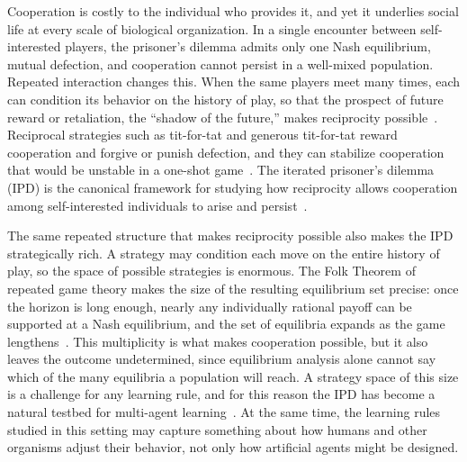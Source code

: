 \documentclass[10pt]{article}
\makeatletter
\renewcommand\section{\@startsection{section}{1}{\z@}{-3ex \@plus -1ex \@minus -.2ex}{1.2ex \@plus .2ex}{\sffamily\bfseries\Large}}
\makeatother
\begin{document}
\section{Introduction}

Cooperation is costly to the individual who provides it, and yet it underlies social life at every scale of biological organization. In a single encounter between self-interested players, the prisoner's dilemma admits only one Nash equilibrium, mutual defection, and cooperation cannot persist in a well-mixed population. Repeated interaction changes this. When the same players meet many times, each can condition its behavior on the history of play, so that the prospect of future reward or retaliation, the ``shadow of the future,'' makes reciprocity possible~\cite{trivers1971-EvolutionReciprocalAltruisma,axelrod1981-EvolutionCooperation}. Reciprocal strategies such as tit-for-tat and generous tit-for-tat reward cooperation and forgive or punish defection, and they can stabilize cooperation that would be unstable in a one-shot game~\cite{nowak1990-EvolutionStochasticStrategies,nowak1992-TitTatHeterogeneous,nowak2006-FiveRulesEvolution}. The iterated prisoner's dilemma (IPD) is the canonical framework for studying how reciprocity allows cooperation among self-interested individuals to arise and persist~\cite{axelrod1981-EvolutionCooperation,nowak2006-EvolutionaryDynamicsExploring}.

The same repeated structure that makes reciprocity possible also makes the IPD strategically rich. A strategy may condition each move on the entire history of play, so the space of possible strategies is enormous. The Folk Theorem of repeated game theory makes the size of the resulting equilibrium set precise: once the horizon is long enough, nearly any individually rational payoff can be supported at a Nash equilibrium, and the set of equilibria expands as the game lengthens~\cite{friedman1971-NoncooperativeEquilibriumSupergames,benoit1985-FinitelyRepeatedGames,fudenberg1986-FolkTheoremRepeated}. This multiplicity is what makes cooperation possible, but it also leaves the outcome undetermined, since equilibrium analysis alone cannot say which of the many equilibria a population will reach. A strategy space of this size is a challenge for any learning rule, and for this reason the IPD has become a natural testbed for multi-agent learning~\cite{sandholm1996-MultiagentReinforcementLearning,bloembergen2015-EvolutionaryDynamicsMultiAgent}. At the same time, the learning rules studied in this setting may capture something about how humans and other organisms adjust their behavior, not only how artificial agents might be designed.
\end{document}
